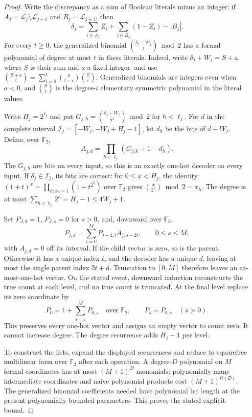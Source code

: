 \documentclass[11pt,letterpaper]{article}
\theoremstyle{definition}
\theoremstyle{remark}
\newcommand{\F}{\mathbb F}
\begin{document}
\begin{proof}
Write the discrepancy as a sum of Boolean literals minus an integer:
if $A_j=\mathcal L_j\setminus\mathcal L_{j+1}$ and
$B_j=\mathcal L_{j+1}$, then
\[
\delta_j=\sum_{i\in A_j}Z_i+\sum_{i\in B_j}(1-Z_i)-|B_j|.
\]
For every $t\ge0$, the generalized binomial
$\binom{\delta_j+W_j}{t}\bmod2$ has a formal polynomial of degree
at most $t$ in these literals. Indeed, write $\delta_j+W_j=S+a$,
where $S$ is their sum and $a$ a fixed integer, and use
$\binom{S+a}{t}=\sum_{i=0}^t\binom a{t-i}\binom Si$.
Generalized binomials are integers even when $a<0$, and $\binom Si$
is the degree-$i$ elementary symmetric polynomial in the literal values.

Write $H_j=2^{\ell_j}$ and put
$G_{j,h}=\binom{\delta_j+W_j}{2^h}\bmod2$ for $h<\ell_j$.
For $d$ in the complete interval
$\mathcal I_j=[-W_j,-W_j+H_j-1]$, let $d_h$ be the bits of $d+W_j$.
Define, over $\F_2$,
\[
A_{j,d}=\prod_{h<\ell_j}(G_{j,h}+1-d_h).
\]
The $G_{j,h}$ are bits on every input, so this is an exactly one-hot
decoder on every input. If $\delta_j\in\mathcal I_j$, its bits are
correct: for $0\le x<H_j$, the identity
$(1+t)^x=\prod_{h:x_h=1}(1+t^{2^h})$ over $\F_2$ gives
$\binom x{2^h}\bmod2=x_h$. The degree is at most
$\sum_{h<\ell_j}2^h=H_j-1\le4W_j+1$.

Set $P_{J,0}=1$, $P_{J,s}=0$ for $s>0$, and, downward over $\F_2$,
\[
P_{j,s}=\sum_{t=0}^M P_{j+1,t} A_{j,s-2t},\qquad 0\le s\le M,
\]
with $A_{j,d}=0$ off its interval. If the child vector is zero, so is
the parent. Otherwise it has a unique index $t$, and the decoder has a
unique $d$, leaving at most the single parent index $2t+d$. Truncation
to $[0,M]$ therefore leaves an at-most-one-hot vector. On the stated
event, downward induction reconstructs the true count at each level,
and no true count is truncated. At the final level replace its zero
coordinate by
\[
P_0=1+\sum_{s=1}^M P_{0,s}\quad\text{over }\F_2,
\qquad P_s=P_{0,s}\quad(s>0).
\]
This preserves every one-hot vector and assigns an empty vector to
count zero. It cannot increase degree. The degree recurrence adds
$H_j-1$ per level.

To construct the lists, expand the displayed recurrences and reduce to
squarefree multilinear form over $\F_2$ after each operation. A
degree-$D$ polynomial on $M$ formal coordinates has at most $(M+1)^D$
monomials; polynomially many intermediate coordinates and naive
polynomial products cost $(M+1)^{O(D)}$. The generalized binomial
coefficients needed have polynomial bit length at the present
polynomially bounded parameters. This proves the stated explicit bound.
\end{proof}
\end{document}
